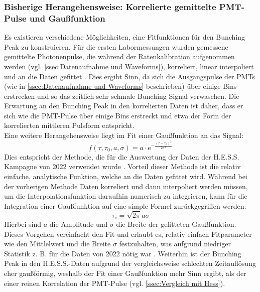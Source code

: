 \subsubsection{Bisherige Herangehensweise: Korrelierte gemittelte PMT-Pulse und Gaußfunktion}
\label{sssec:Fitfunktion - Bisherige Herangehensweise}
Es existieren verschiedene Möglichkeiten, eine Fitfunktionen für den Bunching Peak zu konstruieren. 
Für die ersten Labormessungen wurden gemessene gemittelte Photonenpulse, die während der Ratenkalibration aufgenommen werden (vgl. \autoref{ssec:Datenaufnahme und Waveforms}), korreliert, linear interpoliert und an die Daten gefittet \cite{zmijaOpticalIntensityInterferometry2021}. 
Dies ergibt Sinn, da sich die Ausgangspulse der PMTs (wie in \autoref{ssec:Datenaufnahme und Waveforms} beschrieben) über einige Bins erstrecken und so das zeitlich sehr schmale Bunching Signal verwaschen. 
Die Erwartung an den Bunching Peak in den korrelierten Daten ist daher, dass er sich wie die PMT-Pulse über einige Bins erstreckt und etwa der Form der korrelierten mittleren Pulsform entspricht. \\
Eine weitere Herangehensweise liegt im Fit einer Gaußfunktion an das Signal:
\begin{equation}
    f(\tau, \tau_0, a, \sigma) = a \cdot \mathrm{e}^{- \frac{\left(\tau-\tau_0\right)^2}{2\sigma^2}}
\end{equation} 
Dies entspricht der Methode, die für die Auswertung der Daten der H.E.S.S. Kampagne von 2022 verwendet wurde \cite{zmijaFirstIntensityInterferometry2023}. 
Vorteil dieser Methode ist die relativ einfache, analytische Funktion, welche an die Daten gefittet wird. 
Während bei der vorherigen Methode Daten korreliert und dann interpoliert werden müssen, um die Interpolationsfunktion daraufhin numerisch zu integrieren, kann für die Integration einer Gaußfunktion auf eine simple Formel zurückgegriffen werden:
\begin{equation}
    \tau_{\mathrm{c}} = \sqrt{2\pi} a\sigma
\end{equation}
Hierbei sind $a$ die Amplitude und $\sigma$ die Breite der gefitteten Gaußfunktion. 
Dieses Vorgehen vereinfacht den Fit und erlaubt es, relativ einfach Fitparameter wie den Mittlelwert und die Breite $\sigma$ festzuhalten, was aufgrund niedriger Statistik z. B. für die Daten von 2022 nötig war \cite{zmijaFirstIntensityInterferometry2023}. 
Weiterhin ist der Bunching Peak in den H.E.S.S.-Daten aufgrund der vergleichsweise schlechten Zeitauflösung eher gaußförmig, weshalb der Fit einer Gaußfunktion mehr Sinn ergibt, als der einer reinen Korrelation der PMT-Pulse (vgl. \autoref{ssec:Vergleich mit Hess}). 
